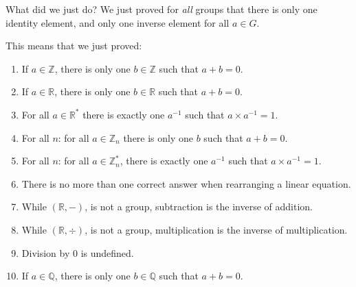 \begin{namedframe}{What did we just do?}
	We just proved for \emph{all} groups that there is only one identity element, and only one inverse element for all $a \in G$.

	This means that we just proved:
	\begin{enumerate}
		\item If $a \in \mathbb{Z}$, there is only one $b \in \mathbb{Z}$ such that $a + b = 0$.
		\item If $a \in \mathbb{R}$, there is only one $b \in \mathbb{R}$ such that $a + b = 0$.
		\item For all $a \in \mathbb{R^*}$ there is exactly one $a^{-1}$ such that $a \times a^{-1} = 1$.
		\item For all $n$: for all $a \in \mathbb{Z}_n$ there is only one $b$ such that $a + b = 0$.
		\item For all $n$: for all $a \in \mathbb{Z}_n^*$, there is exactly one $a^{-1}$ such that $a \times a^{-1} = 1$.
		\item There is no more than one correct answer when rearranging a linear equation.
		\item While $(\mathbb{R}, -)$, is not a group, subtraction is the inverse of addition.
		\item While $(\mathbb{R}, \div)$, is not a group, multiplication is the inverse of multiplication.
		\item Division by $0$ is undefined.
		\item If $a \in \mathbb{Q}$, there is only one $b \in \mathbb{Q}$ such that $a + b = 0$.
	\end{enumerate}
\end{namedframe}
